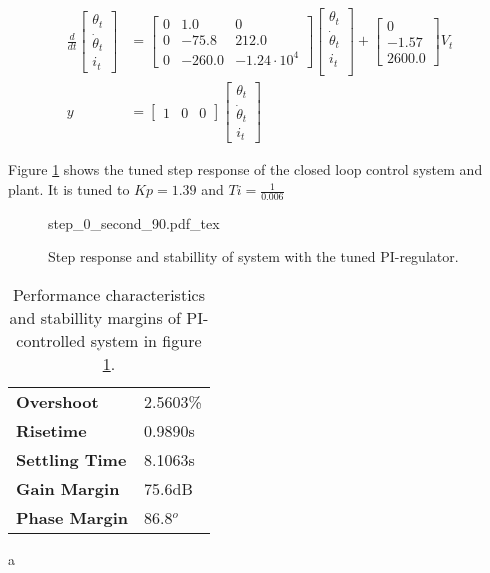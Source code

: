 \documentclass[../../../Main]{subfiles}
\begin{document}
\begin{equation}
      \label{eq:90_linearized}
      \begin{split}
      \frac{d}{dt}
    \begin{bmatrix}
        \theta_t \\
        \dot \theta_t \\
        i_t
    \end{bmatrix}
    &=
    \begin{bmatrix}0 & 1.0 & 0\\ 0  & -75.8 & 212.0\\ 0 & -260.0 & -1.24 \cdot 10^4 \end{bmatrix}
    \begin{bmatrix}
        \theta_t \\
        \dot \theta_t \\
        i_t \\
    \end{bmatrix}
    +
    \begin{bmatrix}
     0\\ -1.57\\ 2600.0
    \end{bmatrix}
    V_t \\
		y &=
    \begin{bmatrix}
        1 & 0 & 0
    \end{bmatrix}
    \begin{bmatrix}
        \theta_t \\
        \dot \theta_t\\
        i_t
    \end{bmatrix}
    \end{split}
\end{equation}

Figure \ref{fig:step_0_second_90} shows the tuned step response of the closed loop control system and plant.
It is tuned to $Kp = 1.39$ and $Ti = \frac{1}{0.006}$
\begin{figure}[H]
\centering
\def\svgwidth{\textwidth}
{step_0_second_90.pdf_tex}
\caption{Step response and stabillity  of system with the tuned PI-regulator.}
\label{fig:step_0_second_90}
\end{figure}

\begin{table}[h]
	 \centering
	 \begin{tabular}{ll}
		 \textbf{Overshoot} & 2.5603\%\\
		 \textbf{Risetime}  & 0.9890s\\
		 \textbf{Settling Time} & 8.1063s\\
		 \textbf{Gain Margin} & 75.6dB\\
		 \textbf{Phase Margin} & 86.8$^o$
	 \end{tabular}
	 \caption{Performance characteristics and stabillity margins of PI-controlled system in figure \ref{fig:step_0_second_90}.}
	 \label{tab:performance_0_3}a
\end{table}
\end{document}
